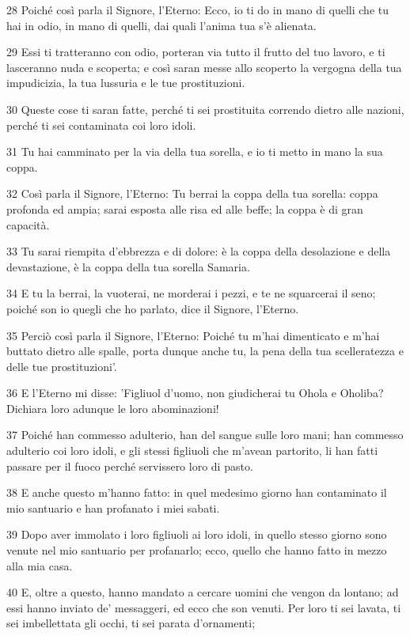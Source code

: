 \par 28 Poiché così parla il Signore, l'Eterno: Ecco, io ti do in mano di quelli che tu hai in odio, in mano di quelli, dai quali l'anima tua s'è alienata.
\par 29 Essi ti tratteranno con odio, porteran via tutto il frutto del tuo lavoro, e ti lasceranno nuda e scoperta; e così saran messe allo scoperto la vergogna della tua impudicizia, la tua lussuria e le tue prostituzioni.
\par 30 Queste cose ti saran fatte, perché ti sei prostituita correndo dietro alle nazioni, perché ti sei contaminata coi loro idoli.
\par 31 Tu hai camminato per la via della tua sorella, e io ti metto in mano la sua coppa.
\par 32 Così parla il Signore, l'Eterno: Tu berrai la coppa della tua sorella: coppa profonda ed ampia; sarai esposta alle risa ed alle beffe; la coppa è di gran capacità.
\par 33 Tu sarai riempita d'ebbrezza e di dolore: è la coppa della desolazione e della devastazione, è la coppa della tua sorella Samaria.
\par 34 E tu la berrai, la vuoterai, ne morderai i pezzi, e te ne squarcerai il seno; poiché son io quegli che ho parlato, dice il Signore, l'Eterno.
\par 35 Perciò così parla il Signore, l'Eterno: Poiché tu m'hai dimenticato e m'hai buttato dietro alle spalle, porta dunque anche tu, la pena della tua scelleratezza e delle tue prostituzioni'.
\par 36 E l'Eterno mi disse: 'Figliuol d'uomo, non giudicherai tu Ohola e Oholiba? Dichiara loro adunque le loro abominazioni!
\par 37 Poiché han commesso adulterio, han del sangue sulle loro mani; han commesso adulterio coi loro idoli, e gli stessi figliuoli che m'avean partorito, li han fatti passare per il fuoco perché servissero loro di pasto.
\par 38 E anche questo m'hanno fatto: in quel medesimo giorno han contaminato il mio santuario e han profanato i miei sabati.
\par 39 Dopo aver immolato i loro figliuoli ai loro idoli, in quello stesso giorno sono venute nel mio santuario per profanarlo; ecco, quello che hanno fatto in mezzo alla mia casa.
\par 40 E, oltre a questo, hanno mandato a cercare uomini che vengon da lontano; ad essi hanno inviato de' messaggeri, ed ecco che son venuti. Per loro ti sei lavata, ti sei imbellettata gli occhi, ti sei parata d'ornamenti;
